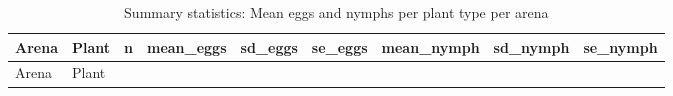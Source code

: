 \documentclass[
]{article}
\begin{document}
\begin{longtable}[]{@{}
  >{\raggedright\arraybackslash}p{}
  >{\raggedright\arraybackslash}p{}
  >{\raggedleft\arraybackslash}p{}
  >{\raggedleft\arraybackslash}p{}
  >{\raggedleft\arraybackslash}p{}
  >{\raggedleft\arraybackslash}p{}
  >{\raggedleft\arraybackslash}p{}
  >{\raggedleft\arraybackslash}p{}
  >{\raggedleft\arraybackslash}p{}@{}}
\caption{Summary statistics: Mean eggs and nymphs per plant type per
arena}\tabularnewline
\toprule\noalign{}
\begin{minipage}[b]{\linewidth}\raggedright
Arena
\end{minipage} & \begin{minipage}[b]{\linewidth}\raggedright
Plant
\end{minipage} & \begin{minipage}[b]{\linewidth}\raggedleft
n
\end{minipage} & \begin{minipage}[b]{\linewidth}\raggedleft
mean\_eggs
\end{minipage} & \begin{minipage}[b]{\linewidth}\raggedleft
sd\_eggs
\end{minipage} & \begin{minipage}[b]{\linewidth}\raggedleft
se\_eggs
\end{minipage} & \begin{minipage}[b]{\linewidth}\raggedleft
mean\_nymph
\end{minipage} & \begin{minipage}[b]{\linewidth}\raggedleft
sd\_nymph
\end{minipage} & \begin{minipage}[b]{\linewidth}\raggedleft
se\_nymph
\end{minipage} \\
\midrule\noalign{}
\endfirsthead
\toprule\noalign{}
\begin{minipage}[b]{\linewidth}\raggedright
Arena
\end{minipage} & \begin{minipage}[b]{\linewidth}\raggedright
Plant
\end{minipage} & \begin{minipage}[b]{\linewidth}\raggedleft

\end{minipage}
\end{longtable}
\end{document}
